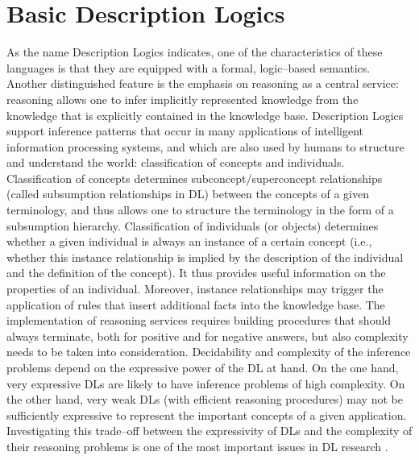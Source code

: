 \documentclass[a4paper, 11pt, oneside]{duthesis}
\begin{document}
\section{Basic Description Logics}
As the name Description Logics indicates, one of the characteristics of these languages is that they are equipped with a formal, logic--based semantics.
Another distinguished feature is the emphasis on reasoning as a central service: reasoning allows one to infer implicitly represented knowledge from the knowledge that is explicitly contained in the knowledge base.
Description Logics support inference patterns that occur in many applications of intelligent information processing systems, and which are also used by humans to structure and understand the world: classification of concepts and individuals.
Classification of concepts determines subconcept/superconcept relationships (called subsumption relationships in DL) between the concepts of a given terminology, and thus allows one to structure the terminology in the form of a subsumption hierarchy.
Classification of individuals (or objects) determines whether a given individual is always an instance of a certain concept (i.e., whether this instance relationship is implied by the description of the individual and the definition of the concept).
It thus provides useful information on the properties of an individual.
Moreover, instance relationships may trigger the application of rules that insert additional facts into the knowledge base.
The implementation of reasoning services requires building procedures that should always terminate, both for positive and for negative answers, but also complexity needs to be taken into consideration.
Decidability and complexity of the inference problems depend on the expressive power of the DL at hand.
On the one hand, very expressive DLs are likely to have inference problems of high complexity.
On the other hand, very weak DLs (with efficient reasoning procedures) may not be sufficiently expressive to represent the important concepts of a given application.
Investigating this trade--off between the expressivity of DLs and the complexity of their reasoning problems is one of the most important issues in DL research
\cite{Baader:2003:BDL:885746.885749}.


\newpage
\end{document}
